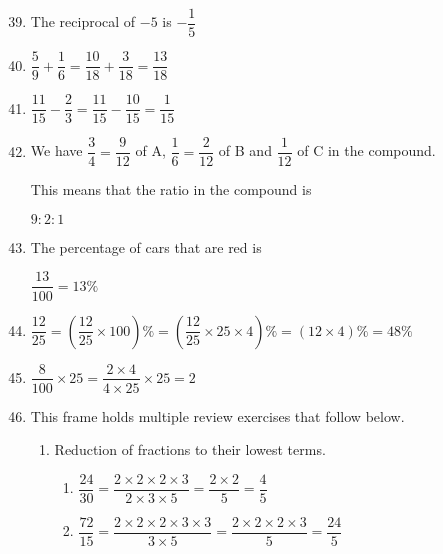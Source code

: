 \documentclass[fleqn]{article}
\begin{document}
\begin{enumerate}[label=\textbf{\arabic*.},labelsep=2em]
\setcounter{enumi}{38}
\item
The reciprocal of $ -5 $ is $ -\dfrac{1}{5} $

\setcounter{enumi}{40}
\item
$ \dfrac{5}{9} + \dfrac{1}{6} = \dfrac{10}{18} + \dfrac{3}{18} = \dfrac{13}{18} $

\setcounter{enumi}{42}
\item
$ \dfrac{11}{15} - \dfrac{2}{3} = \dfrac{11}{15} - \dfrac{10}{15} = \dfrac{1}{15} $

\setcounter{enumi}{46}
\item
We have $ \dfrac{3}{4} = \dfrac{9}{12} $ of A, $ \dfrac{1}{6} = \dfrac{2}{12} $ of B and $ \dfrac{1}{12} $ of C in the compound.

This means that the ratio in the compound is 

$ 9:2:1 $

\setcounter{enumi}{48}
\item
The percentage of cars that are red is

$ \dfrac{13}{100}=13\%$

\setcounter{enumi}{49}
\item
$ \dfrac{12}{25} = \left(\dfrac{12}{25}\times100\right)\% = \left(\dfrac{12}{25}\times25\times4\right)\% = \left(12\times4\right)\%=48\%$

\setcounter{enumi}{51}
\item
$ \dfrac{8}{100}\times25 = \dfrac{2\times4}{4\times25}\times25 = 2 $

\setcounter{enumi}{53}
\item This frame holds multiple review exercises that follow below.

\begin{enumerate}[label=\textbf{\arabic*.},labelsep=2em]

\item
Reduction of fractions to their lowest terms.

\begin{enumerate}[label=\textbf{(\alph*)},labelsep=2em]

\item $ \dfrac{24}{30} = \dfrac{2 \times 2 \times 2 \times 3}{2 \times 3 \times 5} = \dfrac{2 \times 2}{5} = \dfrac{4}{5} $

\item $ \dfrac{72}{15} = \dfrac{2 \times 2 \times 2 \times 3 \times 3}{3 \times 5} = \dfrac{2 \times 2 \times 2 \times 3}{5} = \dfrac{24}{5} $


\end{enumerate}
\end{enumerate}
\end{enumerate}
\end{document}
